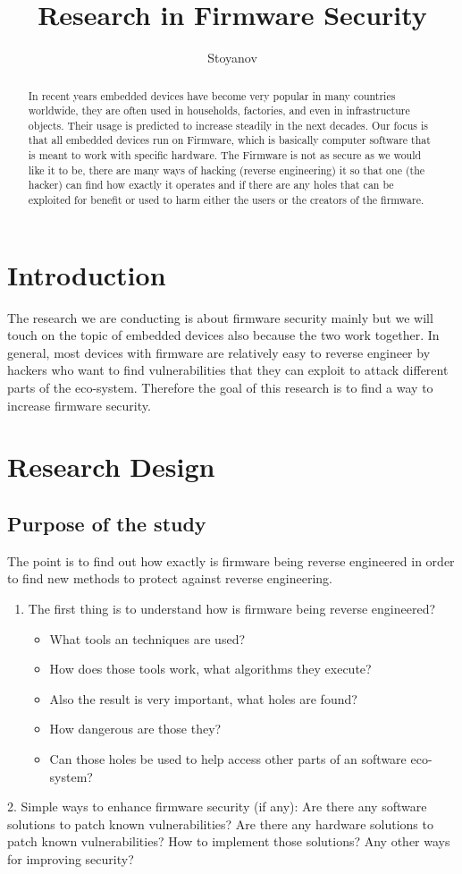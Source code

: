 \documentclass[]{report}
\title{Research in Firmware Security}
\author{Stoyanov}
\begin{document}
\maketitle

\begin{abstract}
	In recent years embedded devices have become very popular in many countries worldwide, they are often used in households, factories, and even in infrastructure objects. Their usage is predicted to increase steadily in the next decades. Our focus is that all embedded devices run on Firmware, which is basically computer software that is meant to work with specific hardware. The Firmware is not as secure as we would like it to be, there are many ways of hacking (reverse engineering) it so that one (the hacker) can find how exactly it operates and if there are any holes that can be exploited for benefit or used to harm either the users or the creators of the firmware.
\end{abstract}

\section{Introduction}
The research we are conducting is about firmware security mainly but we will touch on the topic of embedded devices also because the two work together. In general, most devices with firmware are relatively easy to reverse engineer by hackers who want to find vulnerabilities that they can exploit to attack different parts of the eco-system. Therefore the goal of this research is to find a way to increase firmware security.
\section{Research Design}
\subsection{Purpose of the study} 

The point is to find out how exactly is firmware being reverse engineered in order to find new methods to protect against reverse engineering.
\begin{enumerate}
	\item The first thing is to understand how is firmware being reverse engineered? 
 	\begin{itemize}
 	\item What tools an techniques are used? 
 	\item How does those tools work, what algorithms they execute? 
 	\item Also the result is very important, what holes are found? 
 	\item How dangerous are those they? 
 	\item Can those holes be used to help access other parts of an software eco-system?
 	\end{itemize}
\end{enumerate}
2. Simple ways to enhance firmware security (if any):
Are there any software solutions to patch known vulnerabilities?
Are there any hardware solutions to patch known vulnerabilities?
How to implement those solutions?
Any other ways for improving security?
\end{document}
